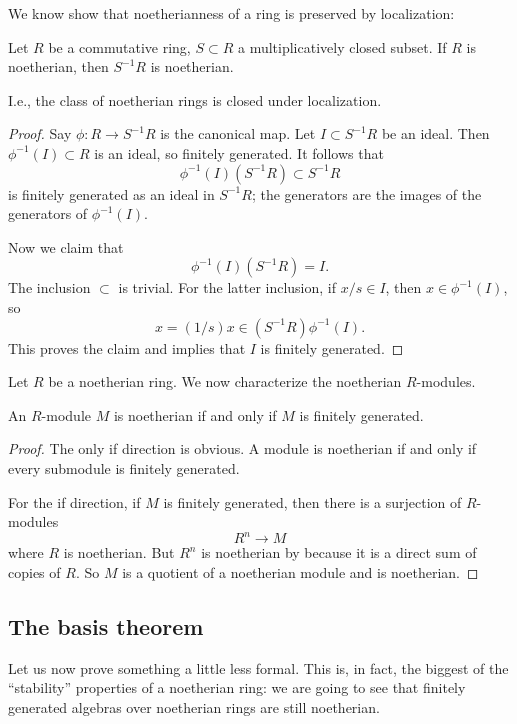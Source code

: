 We know show that noetherianness of a ring is preserved by localization:
\begin{proposition} 
Let $R$ be a commutative ring, $S \subset R$ a multiplicatively closed subset.   If
$R$ is noetherian, then $S^{-1}R$ is noetherian.
\end{proposition} 
I.e., the class of noetherian rings is closed under localization.
\begin{proof} 
Say $\phi: R \to S^{-1}R$ is the canonical map. Let $I \subset S^{-1}R$ be an
ideal. Then $\phi^{-1}(I) \subset R$ is an ideal, so finitely generated. It
follows that
\[ \phi^{-1}(I)( S^{-1}R )\subset S^{-1}R  \]
is finitely generated as an ideal in $S^{-1}R$; the generators are the images
of the generators of $\phi^{-1}(I)$.

Now we claim that
\[  \phi^{-1}(I)( S^{-1}R ) = I . \]
The inclusion $\subset$ is trivial. For the latter inclusion, if $x/s \in I$,
then $x \in \phi^{-1}(I)$, so 
\[ x = (1/s) x \in (S^{-1}R) \phi^{-1}(I).  \] This proves the claim and
implies that $I$ is finitely generated.
\end{proof} 

Let $R$ be a noetherian ring.  We now characterize the noetherian $R$-modules.
\begin{proposition} \label{noetherianiffg} 
An $R$-module $M$ is noetherian if and only if $M$ is finitely generated.
\end{proposition} 
\begin{proof} 
The only if direction is obvious. A module is noetherian if and only if every
submodule is finitely generated. 

For the if direction, if $M$ is finitely generated, then there is  a surjection
of $R$-modules
\[ R^n \to M  \]
where $R$ is noetherian. But $R^n$ is noetherian by
 because it is a direct sum 
of copies of $R$. So $M$ is a quotient of a noetherian module and is noetherian.

\end{proof} 
\subsection{The basis theorem}
Let us now prove something a little less formal. This is, in fact, the biggest
of the ``stability'' properties of a noetherian ring: we are going to see that  finitely generated
algebras over noetherian rings are still noetherian.

